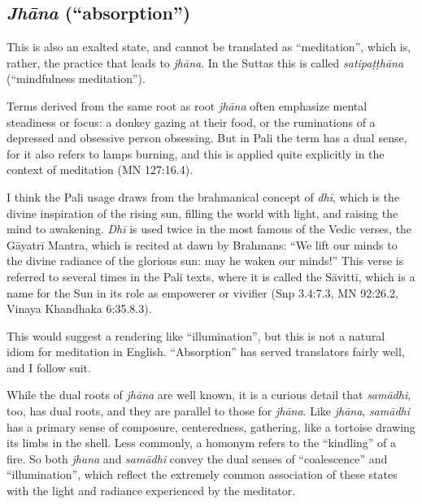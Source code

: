 \documentclass[12pt,openany]{book}%
\begin{document}
\subsection*{\textit{\textsanskrit{Jhāna}} (“absorption”)}

This is also an exalted state, and cannot be translated as “meditation”, which is, rather, the practice that leads to \textit{\textsanskrit{jhāna}}. In the Suttas this is called \textit{\textsanskrit{satipaṭṭhāna}} (“mindfulness meditation”).

Terms derived from the same root as root \textit{\textsanskrit{jhāna}} often emphasize mental steadiness or focus: a donkey gazing at their food, or the ruminations of a depressed and obsessive person obsessing. But in Pali the term has a dual sense, for it also refers to lamps burning, and this is applied quite explicitly in the context of meditation (MN 127:16.4).

I think the Pali usage draws from the brahmanical concept of \textit{\textsanskrit{dhī}}, which is the divine inspiration of the rising sun, filling the world with light, and raising the mind to awakening. \textit{\textsanskrit{Dhī}} is used twice in the most famous of the Vedic verses, the \textsanskrit{Gāyatrī} Mantra,  which is recited at dawn by Brahmans: “We lift our minds to the divine radiance of the glorious sun: may he waken our minds!” This verse is referred to several times in the Pali texts, where it is called the \textsanskrit{Sāvittī}, which is a name for the Sun in its role as empowerer or vivifier (Snp 3.4:7.3, MN 92:26.2, Vinaya Khandhaka 6:35.8.3).

This would suggest a rendering like “illumination”, but this is not a natural idiom for meditation in English. “Absorption” has served translators fairly well, and I follow suit.

While the dual roots of \textit{\textsanskrit{jhāna}} are well known, it is a curious detail that \textit{\textsanskrit{samādhi}}, too, has dual roots, and they are parallel to those for \textit{\textsanskrit{jhāna}}. Like \textit{\textsanskrit{jhāna}}, \textit{\textsanskrit{samādhi}} has a primary sense of composure, centeredness, gathering, like a tortoise drawing its limbs in the shell. Less commonly, a homonym refers to the “kindling” of a fire. So both \textit{jhana} and \textit{\textsanskrit{samādhi}} convey the dual senses of “coalescence” and “illumination”, which reflect the extremely common association of these states with the light and radiance experienced by the meditator.
\end{document}
